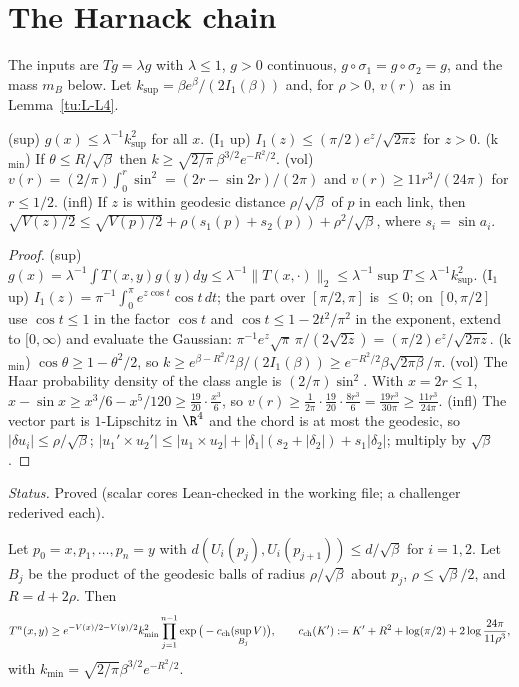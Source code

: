 \section{The Harnack chain}\label{tu:L-sec-harnack}

The inputs are $Tg=\lambda g$ with $\lambda\le1$, $g>0$ continuous, $g\circ\sigma_1=g\circ\sigma_2=g$, and the mass
$m_B$ below. Let $k_{\sup}=\beta e^\beta/(2I_1(\beta))$ and, for $\rho>0$, $v(r)$ as in Lemma~\ref{tu:L-L4}.

\begin{lemma}\label{tu:L-elem}
(sup) $g(x)\le\lambda^{-1}k_{\sup}^2$ for all $x$.
(I$_1$ up) $I_1(z)\le(\pi/2)e^z/\sqrt{2\pi z}$ for $z>0$.
(k$_{\min}$) If $\theta\le R/\sqrt\beta$ then $k\ge\sqrt{2/\pi}\,\beta^{3/2}e^{-R^2/2}$.
(vol) $v(r)=(2/\pi)\int_0^r\sin^2=(2r-\sin2r)/(2\pi)$ and $v(r)\ge11r^3/(24\pi)$ for $r\le1/2$.
(infl) If $z$ is within geodesic distance $\rho/\sqrt\beta$ of $p$ in each link, then
$\sqrt{V(z)/2}\le\sqrt{V(p)/2}+\rho(s_1(p)+s_2(p))+\rho^2/\sqrt\beta$, where $s_i=\sin a_i$.
\end{lemma}

\begin{proof}
(sup) $g(x)=\lambda^{-1}\int T(x,y)g(y)dy\le\lambda^{-1}\|T(x,\cdot)\|_2\le\lambda^{-1}\sup T\le\lambda^{-1}k_{\sup}^2$.
(I$_1$ up) $I_1(z)=\pi^{-1}\int_0^\pi e^{z\cos t}\cos t\,dt$; the part over $[\pi/2,\pi]$ is $\le0$; on $[0,\pi/2]$ use
$\cos t\le1$ in the factor $\cos t$ and $\cos t\le1-2t^2/\pi^2$ in the exponent, extend to $[0,\infty)$ and evaluate the Gaussian:
$\pi^{-1}e^z\sqrt{\pi}\,\pi/(2\sqrt{2z})=(\pi/2)e^z/\sqrt{2\pi z}$.
(k$_{\min}$) $\cos\theta\ge1-\theta^2/2$, so $k\ge e^{\beta-R^2/2}\beta/(2I_1(\beta))\ge e^{-R^2/2}\beta\sqrt{2\pi\beta}/\pi$.
(vol) The Haar probability density of the class angle is $(2/\pi)\sin^2$. With $x=2r\le1$,
$x-\sin x\ge x^3/6-x^5/120\ge\frac{19}{20}\cdot\frac{x^3}6$, so $v(r)\ge\frac1{2\pi}\cdot\frac{19}{20}\cdot\frac{8r^3}6=\frac{19r^3}{30\pi}\ge\frac{11r^3}{24\pi}$.
(infl) The vector part is $1$-Lipschitz in $\R^4$ and the chord is at most the geodesic, so $|\delta u_i|\le\rho/\sqrt\beta$;
$|u_1'\times u_2'|\le|u_1\times u_2|+|\delta_1|(s_2+|\delta_2|)+s_1|\delta_2|$; multiply by $\sqrt\beta$.
\end{proof}

\noindent\emph{Status.} Proved (scalar cores Lean-checked in the working file; a challenger rederived each).

\begin{lemma}[Chain]\label{tu:L-chain}
Let $p_0=x,p_1,\dots,p_n=y$ with $d(U_i(p_j),U_i(p_{j+1}))\le d/\sqrt\beta$ for $i=1,2$. Let $B_j$ be the product of
the geodesic balls of radius $\rho/\sqrt\beta$ about $p_j$, $\rho\le\sqrt\beta/2$, and $R=d+2\rho$. Then
\[
T^n(x,y)\ge e^{-V(x)/2-V(y)/2}k_{\min}^2\prod_{j=1}^{n-1}\exp\big(-c_{\rm ch}(\sup_{B_j}V)\big),\qquad
c_{\rm ch}(K'):=K'+R^2+\log(\pi/2)+2\log\frac{24\pi}{11\rho^3},
\]
with $k_{\min}=\sqrt{2/\pi}\beta^{3/2}e^{-R^2/2}$.
\end{lemma}

